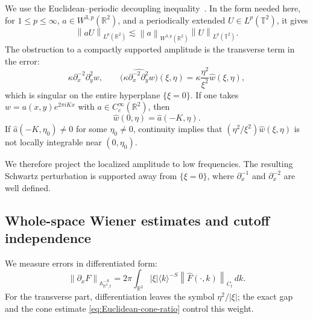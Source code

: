 \documentclass[12pt,reqno,letterpaper]{amsart}
\numberwithin{equation}{section}
\theoremstyle{definition}
\newcommand{\T}{\mathbb T}
\newcommand{\R}{\mathbb R}
\newcommand{\A}{\mathbb A}
\newcommand{\norm}[1]{\left\lVert #1\right\rVert}
\newcommand{\abs}[1]{\left\lvert #1\right\rvert}
\begin{document}
We use the Euclidean--periodic decoupling inequality~\cite[Lemma~2.11]{KSflex}.  In the form needed here, for
$1\leq p\leq\infty$, $a\in W^{3,p}(\R^2)$, and a periodically extended
$U\in L^p(\T^2)$, it gives
\begin{equation}\label{eq:Euclidean-periodic-decoupling}
    \norm{aU}_{L^p(\R^2)}
    \lesssim
    \norm{a}_{W^{3,p}(\R^2)}
    \norm{U}_{L^p(\T^2)}.
\end{equation}
The obstruction to a compactly supported amplitude is the transverse term
in the error:
\[
    \kappa\partial_x^{-2}\partial_y^2w,
    \qquad
    \widehat{\bigl(\kappa\partial_x^{-2}\partial_y^2w\bigr)}(\xi,\eta)
    =\kappa\frac{\eta^2}{\xi^2}\widehat w(\xi,\eta),
\]
which is singular on the entire hyperplane $\{\xi=0\}$.  If one takes
$w=a(x,y)e^{2\pi iKx}$ with $a\in C_c^\infty(\R^2)$, then
\[
    \widehat w(0,\eta)=\widehat a(-K,\eta).
\]
If $\widehat a(-K,\eta_0)\neq0$ for some $\eta_0\neq0$, continuity implies
that $(\eta^2/\xi^2)\widehat w(\xi,\eta)$ is not locally integrable near
$(0,\eta_0)$.

We therefore project the localized amplitude to low frequencies.  The
resulting Schwartz perturbation is supported away from $\{\xi=0\}$, where
$\partial_x^{-1}$ and $\partial_x^{-2}$ are well defined.

\subsection{Whole-space Wiener estimates and cutoff independence}

We measure errors in differentiated form:
\begin{equation}\label{eq:Euclidean-error-norm}
    \norm{\partial_xF}_{\A^{-S}_{\R^2,t}}
    =2\pi\int_{\R^2}\abs\xi\langle k\rangle^{-S}
      \norm{\widehat F(\cdot,k)}_{C_t}\,dk.
\end{equation}
For the transverse part, differentiation leaves the symbol
$\eta^2/\abs\xi$; the exact gap and the cone estimate
\eqref{eq:Euclidean-cone-ratio} control this weight.
\end{document}
